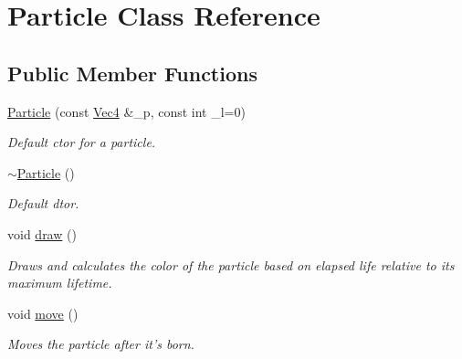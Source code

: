 \hypertarget{classParticle}{
\section{Particle Class Reference}
\label{classParticle}
}
\subsection*{Public Member Functions}
\begin{DoxyCompactItemize}
\item 
\hyperlink{classParticle_aada70e88e292f2c4185e19aa118a1406}{Particle} (const \hyperlink{classVec4}{Vec4} \&\_\-p, const int \_\-l=0)
\begin{DoxyCompactList}\small\item\em Default ctor for a particle. \item\end{DoxyCompactList}\item 
\hypertarget{classParticle_ad030d0fe7b88cf81744b127c99244ff4}{
\hyperlink{classParticle_ad030d0fe7b88cf81744b127c99244ff4}{$\sim$Particle} ()}
\label{classParticle_ad030d0fe7b88cf81744b127c99244ff4}

\begin{DoxyCompactList}\small\item\em Default dtor. \item\end{DoxyCompactList}\item 
\hypertarget{classParticle_ae16ef088e6a411b1a9d926f4d56bdcf3}{
void \hyperlink{classParticle_ae16ef088e6a411b1a9d926f4d56bdcf3}{draw} ()}
\label{classParticle_ae16ef088e6a411b1a9d926f4d56bdcf3}

\begin{DoxyCompactList}\small\item\em Draws and calculates the color of the particle based on elapsed life relative to its maximum lifetime. \item\end{DoxyCompactList}\item 
\hypertarget{classParticle_aa9d73f927c8cdf0c09f7520fa3d2ce46}{
void \hyperlink{classParticle_aa9d73f927c8cdf0c09f7520fa3d2ce46}{move} ()}
\label{classParticle_aa9d73f927c8cdf0c09f7520fa3d2ce46}

\begin{DoxyCompactList}\small\item\em Moves the particle after it's born. \item\end{DoxyCompactList}\end{DoxyCompactItemize}
